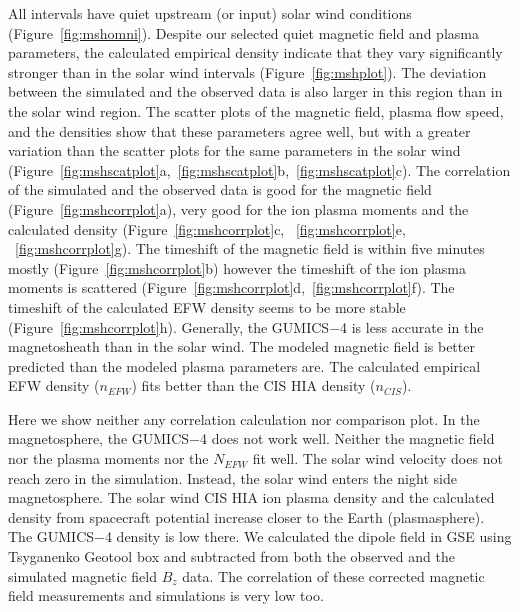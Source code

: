 \documentclass[b5paper,10pt]{article}
\begin{document}
All intervals have quiet upstream (or input) solar wind conditions (Figure~\ref{fig:mshomni}). Despite our selected quiet magnetic field and plasma parameters, the calculated empirical density indicate that they vary significantly stronger than in the solar wind intervals (Figure~\ref{fig:mshplot}). The deviation between the simulated and the observed data is also larger in this region than in the solar wind region. The scatter plots of the magnetic field, plasma flow speed, and the densities show that these parameters agree well, but with a greater variation than the scatter plots for the same parameters in the solar wind (Figure~\ref{fig:mshscatplot}a,~\ref{fig:mshscatplot}b,~\ref{fig:mshscatplot}c). The correlation of the simulated and the observed data is good for the magnetic field (Figure~\ref{fig:mshcorrplot}a), very good for the ion plasma moments and the calculated density (Figure~\ref{fig:mshcorrplot}c, ~\ref{fig:mshcorrplot}e, ~\ref{fig:mshcorrplot}g). The timeshift of the magnetic field is within five minutes mostly (Figure~\ref{fig:mshcorrplot}b) however the timeshift of the ion plasma moments is scattered (Figure~\ref{fig:mshcorrplot}d,~\ref{fig:mshcorrplot}f). The timeshift of the calculated EFW density seems to be more stable (Figure~\ref{fig:mshcorrplot}h). Generally, the GUMICS$-$4 is less accurate in the magnetosheath than in the solar wind. The modeled magnetic field is better predicted than the modeled plasma parameters are. The calculated empirical EFW density ($n_{EFW}$) fits better than the CIS HIA density ($n_{CIS}$).



Here we show neither any correlation calculation nor comparison plot. In the magnetosphere, the GUMICS$-$4 does not work well. Neither the magnetic field nor the plasma moments nor the $N_{EFW}$ fit well. The solar wind velocity does not reach zero in the simulation. Instead, the solar wind enters the night side magnetosphere. The solar wind CIS HIA ion plasma density and the calculated density from spacecraft potential increase closer to the Earth (plasmasphere). The GUMICS$-$4 density is low there. We calculated the dipole field in GSE using Tsyganenko Geotool box \citep{tsyganenko95:_model_earth} and subtracted from both the observed and the simulated magnetic field $B_z$ data. The correlation of these corrected magnetic field measurements and simulations is very low too. 
\end{document}
